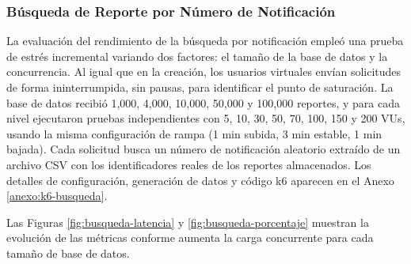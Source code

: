 \subsubsection{Búsqueda de Reporte por Número de Notificación}


La evaluación del rendimiento de la búsqueda por notificación empleó una prueba de estrés incremental variando dos factores: el tamaño de la base de datos y la concurrencia. 
Al igual que en la creación, los usuarios virtuales envían solicitudes de forma ininterrumpida, sin pausas, para identificar el punto de saturación. 
La base de datos recibió 1,000, 4,000, 10,000, 50,000 y 100,000 reportes, y para cada nivel ejecutaron pruebas independientes con 5, 10, 30, 50, 70, 100, 150 y 200 VUs, usando la misma configuración de rampa (1 min subida, 3 min estable, 1 min bajada).
Cada solicitud busca un número de notificación aleatorio extraído de un archivo CSV con los identificadores reales de los reportes almacenados. 
Los detalles de configuración, generación de datos y código k6 aparecen en el Anexo \ref{anexo:k6-busqueda}.

Las Figuras \ref{fig:busqueda-latencia} y \ref{fig:busqueda-porcentaje} muestran la evolución de las métricas conforme aumenta la carga concurrente para cada tamaño de base de datos.


